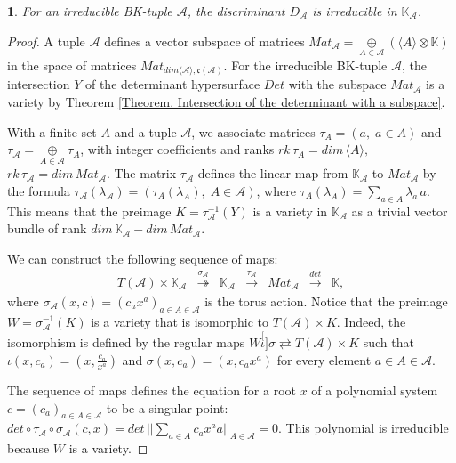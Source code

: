 \documentclass[10pt,a4paper]{amsart}
\newtheorem{thm}{}
\begin{document}
\begin{thm}
\label{Theorem. Esterov's Conjecture}For an irreducible BK-tuple
$\mathscr{A}$, the discriminant $D_{\mathscr{A}}$ is irreducible
in $\mathbb{K}_{\mathscr{A}}$.
\end{thm}

\begin{proof}
A tuple $\mathscr{A}$ defines a vector subspace of matrices $Mat_{\mathscr{A}}=\underset{A\in\mathscr{A}}{\oplus}(\langle A\rangle\otimes\mathbb{K})$
in the space of matrices $Mat_{dim\langle\mathscr{A}\rangle,\mathfrak{c}(\mathscr{A})}$.
For the irreducible BK-tuple $\mathscr{A}$, the intersection $Y$
of the determinant hypersurface $Det$ with the subspace $Mat_{\mathscr{A}}$
is a variety by Theorem \ref{Theorem. Intersection of the determinant with a subspace}.

With a finite set $A$ and a tuple $\mathscr{A}$, we associate matrices
$\tau_{A}=(a,\;a\in A)$ and $\tau_{\mathscr{A}}=\underset{A\in\mathscr{A}}{\oplus}\tau_{A}$,
with integer coefficients and ranks $rk\,\tau_{A}=dim\,\langle A\rangle,$
$rk\,\tau_{\mathscr{A}}=dim\,Mat_{\mathscr{A}}$. The matrix $\tau_{\mathscr{A}}$
defines the linear map from $\mathbb{K}_{\mathscr{A}}$ to $Mat_{\mathscr{A}}$
by the formula $\tau_{\mathscr{A}}(\lambda_{\mathscr{A}})=(\tau_{A}(\lambda_{A}),\;A\in\mathscr{A})$,
where $\tau_{A}(\lambda_{A})=\underset{a\in A}{\sum}\lambda_{a}\,a$.
This means that the preimage $K=\tau_{\mathscr{A}}^{-1}(Y)$ is a
variety in $\mathbb{K}_{\mathscr{A}}$ as a trivial vector bundle
of rank $dim\,\mathbb{K}_{\mathscr{A}}-dim\,Mat_{\mathscr{A}}$.

We can construct the following sequence of maps:
\[
\begin{array}{ccccccc}
T(\mathscr{A})\times\mathbb{K}_{\mathscr{A}} & \overset{\sigma_{\mathscr{A}}}{\twoheadrightarrow} & \mathbb{K}_{\mathscr{A}} & \overset{\tau_{\mathscr{A}}}{\rightarrow} & Mat_{\mathscr{A}} & \overset{det}{\rightarrow} & \mathbb{K},\end{array}
\]
where $\sigma_{\mathscr{A}}(x,c)=(c_{a}x^{a})_{a\in A\in\mathscr{A}}$
is the torus action. Notice that the preimage $W=\sigma_{\mathscr{A}}^{-1}(K)$
is a variety that is isomorphic to $T(\mathscr{A})\times K$. Indeed,
the isomorphism is defined by the regular maps $W\stackrel[\iota]{\sigma}{\rightleftarrows}T(\mathscr{A})\times K$
such that $\iota(x,c_{a})=(x,\frac{c_{a}}{x^{a}})$ and $\sigma(x,c_{a})=(x,c_{a}x^{a})$
for every element $a\in A\in\mathscr{A}.$

The sequence of maps defines the equation for a root $x$ of a polynomial
system $c=(c_{a})_{a\in A\in\mathscr{A}}$ to be a singular point:
$det\circ\tau_{\mathscr{A}}\circ\sigma_{\mathscr{A}}(c,x)=det\,||\underset{a\in A}{\sum}c_{a}x^{a}a||_{A\in\mathscr{A}}=0.$
This polynomial is irreducible because $W$ is a variety.


\end{proof}
\end{document}
